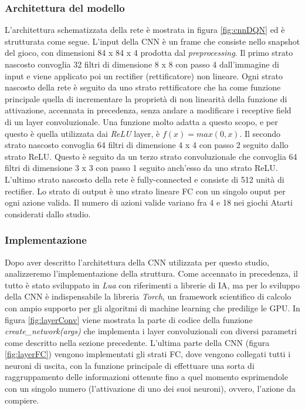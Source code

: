 \documentclass[twoside,twocolumn,10pt]{extarticle}
\theoremstyle{definition}
\begin{document}
\subsubsection{Architettura del modello}
L'architettura schematizzata della rete è mostrata in figura \ref{fig:cnnDQN} ed è strutturata come segue. 
L'input della CNN è un frame che consiste nello snapshot del gioco, con dimensioni 84 x 84 x 4 prodotta dal \textit{preprocessing}. Il primo strato nascosto convoglia 32 filtri di dimensione 8 x 8 con passo 4 dall'immagine di input e viene applicato poi un rectifier (rettificatore) non lineare. Ogni strato nascosto della rete è seguito da uno strato rettificatore che ha come funzione principale quella di incrementare la proprietà di non linearità della funzione di attivazione, accennata in precedenza, senza andare a modificare i receptive field di un layer convoluzionale. Una funzione molto adatta a questo scopo, e per questo è quella utilizzata dai \textit{ReLU} layer, è $f(x) = max(0,x)$.
Il secondo strato nascosto convoglia 64 filtri di dimensione 4 x 4 con passo 2 seguito dallo strato ReLU. Questo è seguito da un terzo strato convoluzionale che convoglia 64 filtri di dimensione 3 x 3 con passo 1 seguito anch'esso da uno strato ReLU. L'ultimo strato nascosto della rete è fully-connected e consiste di 512 unità di rectifier. Lo strato di output è uno strato lineare FC con un singolo ouput per ogni azione valida. Il numero di azioni valide variano fra 4 e 18 nei giochi Atarti considerati dallo studio.

\subsubsection{Implementazione}
Dopo aver descritto l'architettura della CNN utilizzata per questo studio, analizzeremo l'implementazione della struttura. Come accennato in precedenza, il tutto è stato sviluppato in \textit{Lua} con riferimenti a librerie di IA, ma per lo sviluppo della CNN è indispensabile la libreria \textit{Torch}, un framework scientifico di calcolo con ampio supporto per gli algoritmi di machine learning che predilige le GPU. In figura \ref{fig:layerConv} viene mostrata la parte di codice della funzione \textit{create\_network(args)} che implementa i layer convoluzionali con diversi parametri come descritto nella sezione precedente.
L'ultima parte della CNN (figura \ref{fig:layerFC}) vengono implementati gli strati FC, dove vengono collegati tutti i neuroni di uscita, con la funzione principale di effettuare una sorta di raggruppamento delle informazioni ottenute fino a quel momento esprimendole con un singolo numero (l’attivazione di uno dei suoi neuroni), ovvero, l'azione da compiere.
\end{document}
